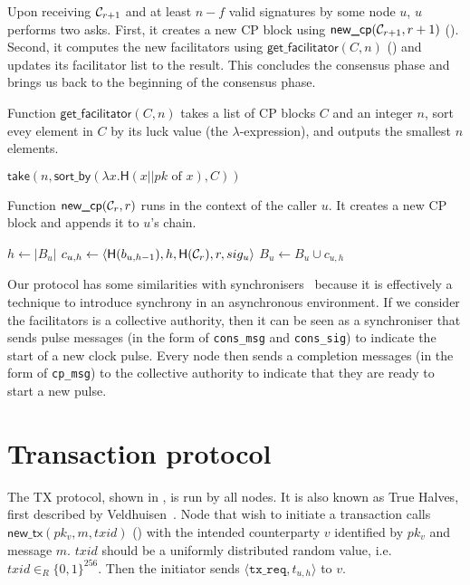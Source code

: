 Upon receiving $\mathcal{C}_{r + 1}$ and at least $n - f$ valid signatures by some node $u$, $u$ performs two asks.
First, it creates a new CP block using $\textsf{new\_cp}(\mathcal{C}_{r + 1}, r + 1)$ ().
Second, it computes the new facilitators using $\textsf{get\_facilitator}(C, n)$ ()
and updates its facilitator list to the result.
This concludes the consensus phase and brings us back to the beginning of the consensus phase.

\begin{algorithm}
\caption{Function $\textsf{get\_facilitator}(C, n)$ takes a list of CP blocks $C$ and an integer $n$,
sort evey element in $C$ by its luck value (the $\lambda$-expression), and outputs the smallest $n$ elements.}
\label{alg:facilitator}
\begin{algorithmic}
\State $\textsf{take} (n, \textsf{sort\_by} (\lambda x.\textsf{H}(x || pk \text{ of } x), C))$
\end{algorithmic}
\end{algorithm}

\begin{algorithm}
\caption{Function $\textsf{new\_cp}(\mathcal{C}_r, r)$ runs in the context of the caller $u$.
It creates a new CP block and appends it to $u$'s chain.}
\label{alg:new-cp}
\begin{algorithmic}
\State $h \gets |B_u|$
\State $c_{u, h} \gets \langle \textsf{H}(b_{u, h-1}), h, \textsf{H}(\mathcal{C}_r), r, sig_u \rangle$
\State $B_u \gets B_u \cup c_{u, h}$
\end{algorithmic}
\end{algorithm}

Our protocol has some similarities with synchronisers~\cite[Chapter 10]{podc} because it is effectively a technique to introduce synchrony in an asynchronous environment.
If we consider the facilitators is a collective authority, then it can be seen as a synchroniser that sends pulse messages (in the form of \texttt{cons\_msg} and \texttt{cons\_sig}) to indicate the start of a new clock pulse.
Every node then sends a completion messages (in the form of \texttt{cp\_msg}) to the collective authority to indicate that they are ready to start a new pulse.


\section{Transaction protocol}
\label{sec:tx-protocol}

The TX protocol, shown in , is run by all nodes.
It is also known as True Halves, first described by Veldhuisen~\cite[Chapter~3.2]{truehalves}.
Node that wish to initiate a transaction calls $\textsf{new\_tx}(pk_v, m, txid)$ () with the intended counterparty $v$ identified by $pk_v$ and message $m$.
$txid$ should be a uniformly distributed random value, i.e. $txid \in_R \{0, 1\}^{256}$.
Then the initiator sends $\langle \texttt{tx\_req}, t_{u, h}\rangle$ to $v$.


